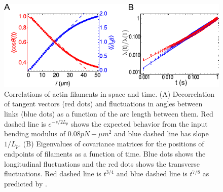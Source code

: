 \documentclass[12pt]{article}
\begin{document}
\begin{figure}[H] 
  \centering
   \includegraphics[scale=1]{figs/filament/pl_fig.pdf}
  \caption{\label{fig:filament}
  Correlations of actin filaments in space and time.
  (A) Decorrelation of tangent vectors (red dots) and fluctuations in angles
  between links (blue dots) as a function of the arc length between them. Red 
  dashed line is $e^{-s/2L_p}$ shows the expected behavior from the input
  bending modulus of $0.08 pN-\mu m^2$ and blue dashed line has slope $1/L_p$.
  (B) Eigenvalues of covariance matrices for the positions of endpoints of
  filaments as a function of time. Blue dots shows the longitudinal fluctuations and
  the red dots shows the transverse fluctuations. Red dashed line is
  $t^{3/4}$ and blue dashed line is $t^{7/8}$ as predicted by \cite{everaers1999}. 
}
\end{figure} 
\end{document}
